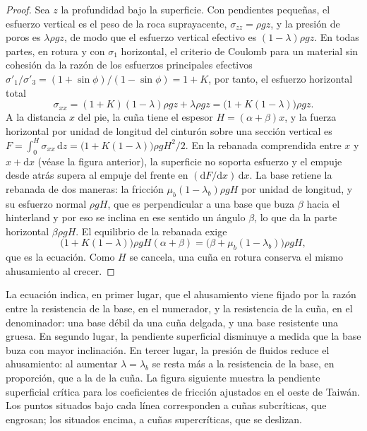 \begin{proof}
Sea $z$ la profundidad bajo la superficie. Con pendientes pequeñas, el esfuerzo vertical
es el peso de la roca suprayacente, $\sigma_{zz} = \rho g z$, y la presión
de poros es $\lambda\rho g z$, de modo que el esfuerzo vertical efectivo es
$(1 - \lambda)\rho g z$. En todas partes, en rotura y con $\sigma_1$ horizontal,
el criterio de Coulomb para un material sin cohesión da la razón de los
esfuerzos principales efectivos $\sigma'_1/\sigma'_3 = (1 + \sin\phi)/(1 -
\sin\phi) = 1 + K$, por tanto, el esfuerzo horizontal total
\[
  \sigma_{xx} = (1 + K)(1 - \lambda)\rho g z + \lambda\rho g z
  = \bigl(1 + K(1 - \lambda)\bigr)\rho g z .
\]
A la distancia $x$ del pie, la cuña tiene el espesor $H = (\alpha +
\beta)x$, y la fuerza horizontal por unidad de longitud del cinturón sobre una
sección vertical es $F = \int_0^H \sigma_{xx}\,\mathrm dz = \bigl(1 + K(1 -
\lambda)\bigr)\rho g H^2/2$. En la rebanada comprendida entre $x$ y $x + \mathrm dx$
(véase la figura anterior), la superficie no soporta esfuerzo y el empuje desde atrás
supera al empuje del frente en $(\mathrm dF/\mathrm dx)\,\mathrm dx$.
La base retiene la rebanada de dos maneras: la fricción $\mu_b(1 -
\lambda_b)\rho g H$ por unidad de longitud, y su esfuerzo normal $\rho g H$, que
es perpendicular a una base que buza $\beta$ hacia el hinterland y por eso
se inclina en ese sentido un ángulo $\beta$, lo que da la parte horizontal $\beta\rho g H$.
El equilibrio de la rebanada exige
\[
  \bigl(1 + K(1 - \lambda)\bigr)\rho g H(\alpha + \beta)
  = \bigl(\beta + \mu_b(1 - \lambda_b)\bigr)\rho g H ,
\]
que es la ecuación. Como $H$ se cancela, una cuña en rotura conserva el mismo
ahusamiento al crecer.
\end{proof}

La ecuación indica, en primer lugar, que el ahusamiento viene fijado por la razón entre la resistencia
de la base, en el numerador, y la resistencia de la cuña, en el
denominador: una base débil da una cuña delgada, y una base resistente una gruesa.
En segundo lugar, la pendiente superficial disminuye a medida que la base buza con mayor inclinación. En tercer lugar, la presión de fluidos
reduce el ahusamiento: al aumentar $\lambda = \lambda_b$ se resta más a la
resistencia de la base, en proporción, que a la de la cuña.
La figura siguiente muestra la pendiente superficial crítica para los coeficientes de fricción
ajustados en el oeste de Taiwán. Los puntos situados bajo cada línea corresponden a cuñas subcríticas, que engrosan;
los situados encima, a cuñas supercríticas, que se deslizan.


